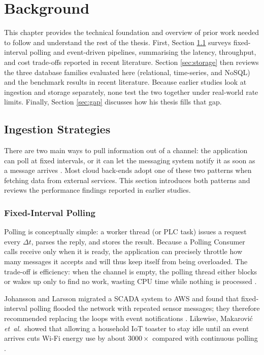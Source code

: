 \documentclass[nomenclature, english, biblatex]{kththesis}
\numberwithin{listing}{chapter}
\begin{document}
\cleardoublepage
\chapter{Background}
\label{ch:background}

This chapter provides the technical foundation and overview of prior work needed to follow and understand the rest of the thesis. First,
Section \ref{sec:ingestion} surveys fixed-interval polling and event-driven pipelines, summarising the latency, throughput, and cost trade-offs reported in recent literature. Section \ref{sec:storage} then reviews the three database families evaluated here (relational, time-series, and NoSQL) and the benchmark results in recent literature. Because earlier studies look at ingestion and storage separately, none test the two together under real-world rate limits. Finally, Section \ref{sec:gap} discusses how his thesis fills that gap.



\section{Ingestion Strategies}
\label{sec:ingestion}
There are two main ways to pull information out of a channel: the application can poll at fixed intervals, or it can let the messaging system notify it as soon as a message arrives \cite[Ch.~10]{Hohpe2003EIP}.
Most cloud back-ends adopt one of these two patterns when fetching data from external services. This section introduces both patterns and reviews the performance findings reported in earlier studies.


\subsection{Fixed-Interval Polling}
Polling is conceptually simple: a worker thread (or PLC task) issues a request every $\Delta t$, parses the reply, and stores the result.
Because a Polling Consumer calls receive only when it is ready, the application can precisely throttle how many messages it accepts and will thus keep itself from being overloaded.
The trade-off is efficiency: when the channel is empty, the polling thread either blocks or wakes up only to find no work, wasting CPU time while nothing is processed \cite[pp.~494–497]{Hohpe2003EIP}.

Johansson and Larsson migrated a \gls{SCADA} system to AWS and found that fixed‐interval polling flooded the network with repeated sensor messages; they therefore recommended replacing the loops with event notifications \cite{Johansson2021SCADAIaaS}. 
Likewise, Makarović \textit{et~al.}\ showed that allowing a household  \gls{IoT} toaster to stay idle until an event arrives cuts Wi-Fi energy use by about \(3000\times\) compared with continuous polling \cite{Makarovi2022EnergyEfficientIoT}.
\end{document}
